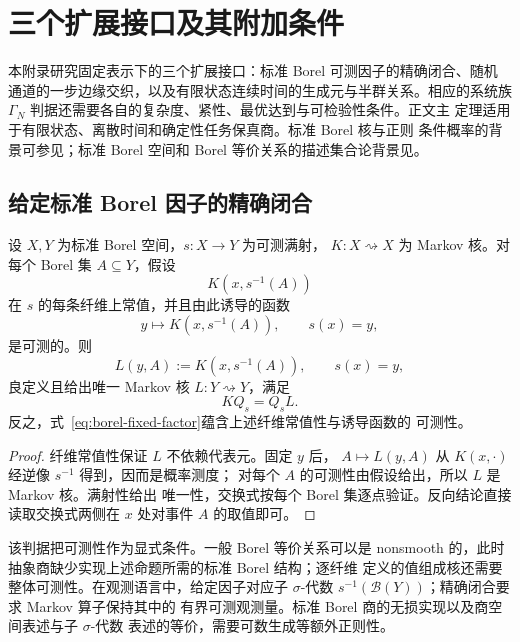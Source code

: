\section{三个扩展接口及其附加条件}
\label{app:extensions}

本附录研究固定表示下的三个扩展接口：标准 Borel 可测因子的精确闭合、随机
通道的一步边缘交织，以及有限状态连续时间的生成元与半群关系。相应的系统族
$\Gamma_N$ 判据还需要各自的复杂度、紧性、最优达到与可检验性条件。正文主
定理适用于有限状态、离散时间和确定性任务保真商。标准 Borel 核与正则
条件概率的背景可参见\citet{Kallenberg2021}；标准 Borel 空间和 Borel
等价关系的描述集合论背景见\citet{Kechris1995}。

\subsection{给定标准 Borel 因子的精确闭合}

\begin{proposition}
\label{prop:borel-fixed-factor}
设 $X,Y$ 为标准 Borel 空间，$s:X\to Y$ 为可测满射，
$K:X\rightsquigarrow X$ 为 Markov 核。对每个 Borel 集
$A\subseteq Y$，假设
\[
K(x,s^{-1}(A))
\]
在 $s$ 的每条纤维上常值，并且由此诱导的函数
\[
y\longmapsto K(x,s^{-1}(A)),
\qquad s(x)=y,
\]
是可测的。则
\[
L(y,A):=K(x,s^{-1}(A)),
\qquad s(x)=y,
\]
良定义且给出唯一 Markov 核 $L:Y\rightsquigarrow Y$，满足
\begin{equation}
KQ_s=Q_sL.
\label{eq:borel-fixed-factor}
\end{equation}
反之，式~\eqref{eq:borel-fixed-factor}蕴含上述纤维常值性与诱导函数的
可测性。
\end{proposition}

\begin{proof}
纤维常值性保证 $L$ 不依赖代表元。固定 $y$ 后，
$A\mapsto L(y,A)$ 从 $K(x,\cdot)$ 经逆像 $s^{-1}$ 得到，因而是概率测度；
对每个 $A$ 的可测性由假设给出，所以 $L$ 是 Markov 核。满射性给出
唯一性，交换式按每个 Borel 集逐点验证。反向结论直接读取交换式两侧在
$x$ 处对事件 $A$ 的取值即可。
\end{proof}

该判据把可测性作为显式条件。一般 Borel 等价关系可以是 nonsmooth 的，此时
抽象商缺少实现上述命题所需的标准 Borel 结构\citep{Kechris1995}；逐纤维
定义的值组成核还需要整体可测性。在观测语言中，给定因子对应子
$\sigma$-代数 $s^{-1}(\mathcal B(Y))$；精确闭合要求 Markov 算子保持其中的
有界可测观测量。标准 Borel 商的无损实现以及商空间表述与子 $\sigma$-代数
表述的等价，需要可数生成等额外正则性。

